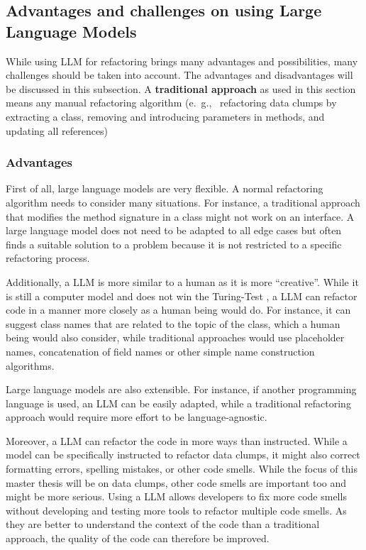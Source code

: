 \subsection{Advantages and challenges on using Large Language Models}\label{sec:llm_challenges}

While using  \ac{LLM} for refactoring brings many advantages  and possibilities, many challenges should be taken into account. The advantages and disadvantages will be discussed in this subsection. A \textbf{traditional approach} as used in this section means any manual refactoring algorithm (e.~g.,~ refactoring data clumps by extracting a class, removing and introducing parameters in methods, and updating all references)

\subsubsection{Advantages}

First of all, large language models are very flexible. A normal refactoring algorithm needs to consider many situations. For instance, a traditional approach that modifies the method signature in a class might not work on an interface. A large language model does not need to be adapted to all edge cases but often finds a suitable solution to a problem because it is not restricted to a specific refactoring process. \cite{shirafuji2023refactoring}

Additionally, a \ac{LLM} is more similar to a human as it is more  \enquote{creative}. While it is still a computer model and does not win the Turing-Test \cite{turing_test}, a \ac{LLM} can refactor code in a manner more closely as a human being would do. For instance, it can suggest class names that are related to the topic of the class, which a human being would also consider, while traditional approaches would use placeholder names, concatenation of field names or other simple name construction algorithms. \cite{shirafuji2023refactoring}

Large language models are also extensible. For instance, if another programming language is used, an \ac{LLM} can be easily adapted, while a traditional refactoring approach would require more effort to be language-agnostic.

Moreover, a \ac{LLM} can refactor the code in more ways than instructed. While a model can be specifically instructed to refactor data clumps, it might also correct formatting errors, spelling mistakes, or other code smells. While the focus of this master thesis will be on data clumps, other code smells are important too and might be more serious. Using a  \ac{LLM} allows developers to fix more code smells without developing and testing more tools to refactor multiple code smells. As they are better to understand the context of the code than a traditional approach, the quality of the code can therefore be improved. \cite{shirafuji2023refactoring}

